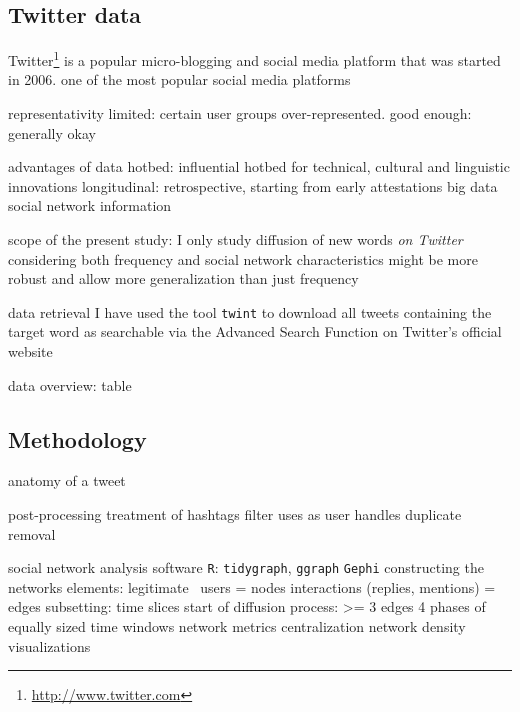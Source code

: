 \documentclass[a4paper, abstract=on]{scrartcl}
\newcommand{\sw}[1]{\texttt{#1}}
\begin{document}
  \subsection{Twitter data}

    Twitter\footnote{\url{http://www.twitter.com}} is a popular micro-blogging and social media platform that was started in 2006.
      one of the most popular social media platforms

    representativity
      limited: certain user groups over-represented.
      good enough: generally okay \parencite{Grieve2019a}

    advantages of data
      hotbed: influential hotbed for technical, cultural and linguistic innovations
      longitudinal: retrospective, starting from early attestations
      big data
      social network information

    scope of the present study:
      I only study diffusion of new words \emph{on Twitter}
        considering both frequency and social network characteristics might be more robust and allow more generalization than just frequency

    data retrieval
      I have used the tool \sw{twint}
      to download all tweets containing the target word
      as searchable via the Advanced Search Function on Twitter's official website

    data overview: table

  \subsection{Methodology}

    anatomy of a tweet

    post-processing
      treatment of hashtags
      filter uses as user handles
      duplicate removal

    social network analysis
      software
        \sw{R}: \sw{tidygraph}, \sw{ggraph}
        \sw{Gephi}
      constructing the networks
        elements: legitimate~\parencite{Goel2016}
          users = nodes
          interactions (replies, mentions) = edges
        subsetting: time slices
            start of diffusion process: >= 3 edges
            4 phases of equally sized time windows
        network metrics
          centralization
          network density
        visualizations
\end{document}
